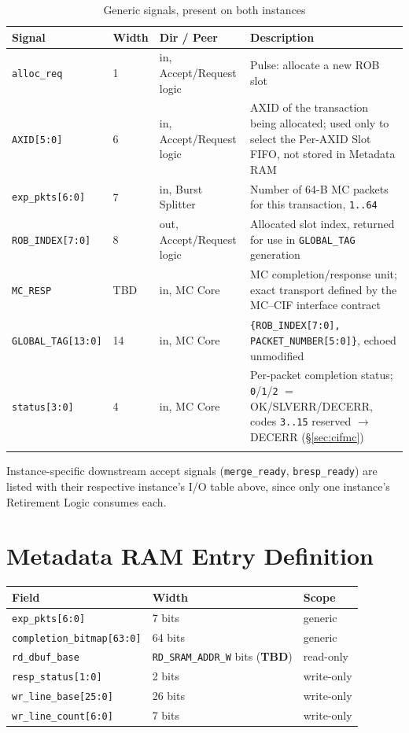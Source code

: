 \begin{longtable}{p{3cm}p{1cm}p{3cm}p{7cm}}
\toprule
\textbf{Signal} & \textbf{Width} & \textbf{Dir / Peer} & \textbf{Description} \\
\midrule
\texttt{alloc\_req}       & 1  & in, Accept/Request logic & Pulse: allocate a new ROB slot \\
\texttt{AXID[5:0]}        & 6  & in, Accept/Request logic & AXID of the transaction being allocated; used only to select the Per-AXID Slot FIFO, not stored in Metadata RAM \\
\texttt{exp\_pkts[6:0]}   & 7  & in, Burst Splitter & Number of 64-B MC packets for this transaction, \texttt{1..64} \\
\texttt{ROB\_INDEX[7:0]}  & 8  & out, Accept/Request logic & Allocated slot index, returned for use in \texttt{GLOBAL\_TAG} generation \\
\texttt{MC\_RESP} & TBD & in, MC Core & MC completion/response unit; exact transport defined by the MC--CIF interface contract \\
\texttt{GLOBAL\_TAG[13:0]} & 14 & in, MC Core & \texttt{\{ROB\_INDEX[7:0], PACKET\_NUMBER[5:0]\}}, echoed unmodified \\
\texttt{status[3:0]}      & 4  & in, MC Core & Per-packet completion status; \texttt{0}/\texttt{1}/\texttt{2} $=$ OK/SLVERR/DECERR, codes \texttt{3..15} reserved $\rightarrow$ DECERR (\S\ref{sec:cifmc}) \\
\bottomrule
\caption{Generic signals, present on both instances}
\end{longtable}

\noindent Instance-specific downstream accept signals (\texttt{merge\_ready}, \texttt{bresp\_ready}) are listed with their respective instance's I/O table above, since only one instance's Retirement Logic consumes each.

\section{Metadata RAM Entry Definition}
\label{sec:entry}

\begin{center}
\begin{tabular}{lll}
\toprule
\textbf{Field} & \textbf{Width} & \textbf{Scope} \\
\midrule
\texttt{exp\_pkts[6:0]}           & 7 bits          & generic \\
\texttt{completion\_bitmap[63:0]} & 64 bits         & generic \\
\texttt{rd\_dbuf\_base}           & \texttt{RD\_SRAM\_ADDR\_W} bits (\textbf{TBD}) & read-only \\
\texttt{resp\_status[1:0]}        & 2 bits          & write-only \\
\texttt{wr\_line\_base[25:0]}     & 26 bits         & write-only \\
\texttt{wr\_line\_count[6:0]}     & 7 bits          & write-only \\
\bottomrule
\end{tabular}
\end{center}

